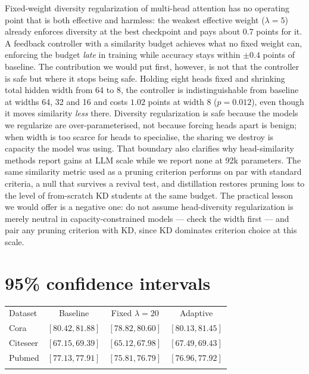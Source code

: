 \documentclass{ws-ijprai}
\begin{document}
Fixed-weight diversity regularization of multi-head attention has no operating
point that is both effective and harmless: the weakest effective weight
($\lambda=5$) already enforces diversity at the best checkpoint and pays
about 0.7 points for it. A feedback controller with a similarity budget achieves
what no fixed weight can, enforcing the budget \emph{late} in training while
accuracy stays within $\pm 0.4$ points of baseline. The contribution we would
put first, however, is not that the controller is safe but where it stops being
safe. Holding eight heads fixed and shrinking total hidden width from 64 to 8,
the controller is indistinguishable from baseline at widths 64, 32 and 16 and
costs $1.02$ points at width 8 ($p=0.012$), even though it moves similarity
\emph{less} there. Diversity regularization is safe because the models we
regularize are over-parameterised, not because forcing heads apart is benign;
when width is too scarce for heads to specialise, the sharing we destroy is
capacity the model was using. That boundary also clarifies why head-similarity
methods report gains at LLM scale while we report none at 92k parameters. The
same similarity metric used as a pruning criterion performs on par with
standard criteria, a null that survives a revival test, and distillation
restores pruning loss to the level of from-scratch KD students at the same
budget. The practical lesson we would offer is a negative one: do not assume
head-diversity regularization is merely neutral in capacity-constrained models
--- check the width first --- and pair any pruning criterion with KD, since KD
dominates criterion choice at this scale.




\appendix

\clearpage
\section{95\% confidence intervals}

\begin{table}[ht]
{\begin{tabular*}{\textwidth}{@{\extracolsep{\fill}}lccc}
\toprule
Dataset & Baseline & Fixed $\lambda{=}20$ & Adaptive \\
\colrule
Cora & $[80.42, 81.88]$ & $[78.82, 80.60]$ & $[80.13, 81.45]$ \\
Citeseer & $[67.15, 69.39]$ & $[65.12, 67.98]$ & $[67.49, 69.43]$ \\
Pubmed & $[77.13, 77.91]$ & $[75.81, 76.79]$ & $[76.96, 77.92]$ \\
\botrule
\end{tabular*}}
\end{table}
\end{document}
